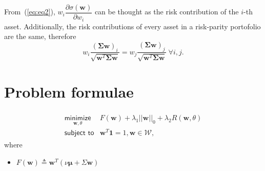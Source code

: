 \documentclass{article}
\begin{document}
From~(\ref{eq:eq2}), $w_{i}\dfrac{\partial \sigma(\bm{w})}{\partial w_i}$ can be
thought as the risk contribution of the $i$-th asset. Additionally, the risk
contributions of every asset in a risk-parity portofolio are the same, therefore
\begin{equation}
w_i \dfrac{(\bm{\Sigma}{\bm{w}})_{i}}{\sqrt{\bm{w}^{T}\bm{\Sigma}\bm{w}}} =
w_j \dfrac{(\bm{\Sigma}{\bm{w}})_{j}}{\sqrt{\bm{w}^{T}\bm{\Sigma}\bm{w}}}~\forall i, j.
\end{equation}

\section{Problem formulae}
\begin{align}\begin{array}{ll}
\underset{\bm{w}, \theta}{\textsf{minimize}} & F(\bm{w}) + \lambda_{1}||\bm{w}||_{0} + \lambda_{2}R(\bm{w}, \theta)\\
\textsf{subject to} & \bm{w}^{T}\bm{1} = 1, \bm{w} \in \mathcal{W},
\end{array}\end{align}
where
\begin{itemize}
    \item $F(\bm{w}) \triangleq \bm{w}^{T}(\nu \bm{\mu} + \Sigma\bm{w})$
\end{itemize}
\end{document}
